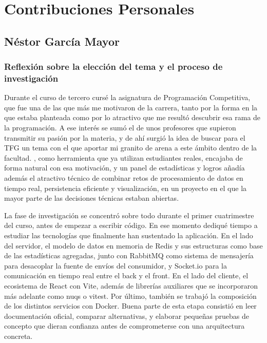 \chapter{Contribuciones Personales}
\label{cap:contribucionesPersonales}

\section*{Néstor García Mayor}

\subsection*{Reflexión sobre la elección del tema y el proceso de investigación}

Durante el curso de tercero cursé la asignatura de Programación Competitiva, que fue una de las que más me motivaron de la carrera, tanto por la forma en la que estaba planteada como por lo atractivo que me resultó descubrir esa rama de la programación. A ese interés se sumó el de unos profesores que supieron transmitir su pasión por la materia, y de ahí surgió la idea de buscar para el TFG un tema con el que aportar mi granito de arena a este ámbito dentro de la facultad. \aer, como herramienta que ya utilizan estudiantes reales, encajaba de forma natural con esa motivación, y un panel de estadísticas y logros añadía además el atractivo técnico de combinar retos de procesamiento de datos en tiempo real, persistencia eficiente y visualización, en un proyecto en el que la mayor parte de las decisiones técnicas estaban abiertas.

La fase de investigación se concentró sobre todo durante el primer cuatrimestre del curso, antes de empezar a escribir código. En ese momento dediqué tiempo a estudiar las tecnologías que finalmente han sustentado la aplicación. En el lado del servidor, el modelo de datos en memoria de Redis y sus estructuras como base de las estadísticas agregadas, junto con RabbitMQ como sistema de mensajería para desacoplar la fuente de envíos del consumidor, y Socket.io para la comunicación en tiempo real entre el back y el front. En el lado del cliente, el ecosistema de React con Vite, además de librerías auxiliares que se incorporaron más adelante como nuqs o vitest. Por último, también se trabajó la composición de los distintos servicios con Docker. Buena parte de esta etapa consistió en leer documentación oficial, comparar alternativas, y elaborar pequeñas pruebas de concepto que dieran confianza antes de comprometerse con una arquitectura concreta.

